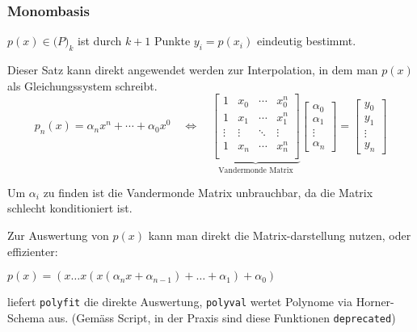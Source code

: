 \subsubsection{Monombasis}

 $p(x) \in \mathcal(P)_k$ ist durch $k+1$ Punkte $y_i = p(x_i)$ eindeutig bestimmt.

Dieser Satz kann direkt angewendet werden zur Interpolation, in dem man $p(x)$ als Gleichungssystem schreibt.
$$
	p_n(x) = \alpha_n x^n + \cdots + \alpha_0 x^0 \quad \iff \quad
	\underbrace{
		\begin{bmatrix}
			1      & x_0    & \cdots & x_0^n  \\
			1      & x_1    & \cdots & x_1^n  \\
			\vdots & \vdots & \ddots & \vdots \\
			1      & x_n    & \cdots & x_n^n  \\
		\end{bmatrix}
	}_\text{Vandermonde Matrix}
	\begin{bmatrix}
		\alpha_0 \\
		\alpha_1 \\
		\vdots   \\
		\alpha_n
	\end{bmatrix}
	=
	\begin{bmatrix}
		y_0    \\
		y_1    \\
		\vdots \\
		y_n
	\end{bmatrix}
$$

Um $\alpha_i$ zu finden ist die Vandermonde Matrix unbrauchbar, da die Matrix schlecht konditioniert ist.

Zur Auswertung von $p(x)$ kann man direkt die Matrix-darstellung nutzen, oder effizienter:

 $p(x) = (x \ldots x ( x (\alpha_n x + \alpha_{n-1}) + \ldots + \alpha_1) + \alpha_0)$

\innumpy liefert \verb|polyfit| die direkte Auswertung, \verb|polyval| wertet Polynome via Horner-Schema aus. (Gemäss Script, in der Praxis sind diese Funktionen \verb|deprecated|)
